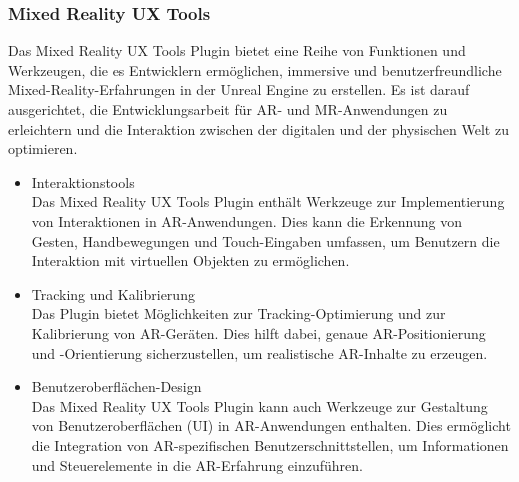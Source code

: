 \subsubsection{Mixed Reality UX Tools}
Das Mixed Reality UX Tools Plugin bietet eine Reihe von Funktionen und Werkzeugen, die es
Entwicklern ermöglichen, immersive und benutzerfreundliche Mixed-Reality-Erfahrungen in der
Unreal Engine zu erstellen. Es ist darauf ausgerichtet, die Entwicklungsarbeit für AR- und
MR-Anwendungen zu erleichtern und die Interaktion zwischen der digitalen und der physischen
Welt zu optimieren.
\begin{itemize}
    \item Interaktionstools\\
    Das Mixed Reality UX Tools Plugin enthält Werkzeuge zur Implementierung von Interaktionen
    in AR-Anwendungen. Dies kann die Erkennung von Gesten, Handbewegungen und Touch-Eingaben
    umfassen, um Benutzern die Interaktion mit virtuellen Objekten zu ermöglichen.
    \item Tracking und Kalibrierung\\
    Das Plugin bietet Möglichkeiten zur Tracking-Optimierung und zur Kalibrierung von
    AR-Geräten. Dies hilft dabei, genaue AR-Positionierung und -Orientierung sicherzustellen,
    um realistische AR-Inhalte zu erzeugen.
    \item Benutzeroberflächen-Design\\
    Das Mixed Reality UX Tools Plugin kann auch Werkzeuge zur Gestaltung von Benutzeroberflächen
    (UI) in AR-Anwendungen enthalten. Dies ermöglicht die Integration von AR-spezifischen
    Benutzerschnittstellen, um Informationen und Steuerelemente in die AR-Erfahrung einzuführen.
\end{itemize}

